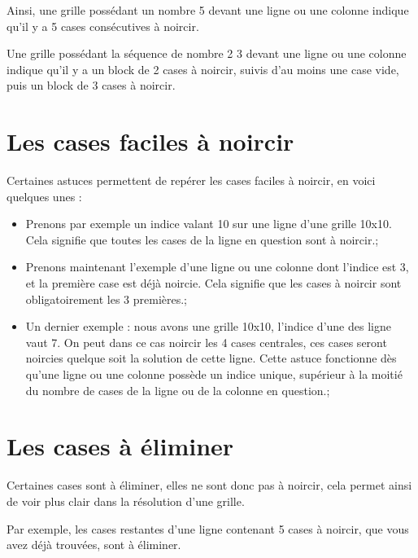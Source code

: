 \documentclass[a4paper, 12pt]{report}
\begin{document}
	        Ainsi, une grille possédant un nombre 5 devant une ligne ou une colonne indique qu'il y a 5 cases consécutives à noircir.

	        Une grille possédant la séquence de nombre 2 3 devant une ligne ou une colonne indique qu'il y a un block de 2 cases à noircir, suivis d'au moins une case vide, puis un block de 3 cases à noircir.


		\section{Les cases faciles à noircir}

            Certaines astuces permettent de repérer les cases faciles à noircir, en voici quelques unes :
            \begin{itemize}
                \item Prenons par exemple un indice valant 10 sur une ligne d'une grille 10x10. Cela signifie que toutes les cases de la ligne en question sont à noircir.;
                \item Prenons maintenant l'exemple d'une ligne ou une colonne dont l'indice est 3, et la première case est déjà noircie. Cela signifie que les cases à noircir sont obligatoirement les 3 premières.;
                \item Un dernier exemple : nous avons une grille 10x10, l'indice d'une des ligne vaut 7. On peut dans ce cas noircir les 4 cases centrales, ces cases seront noircies quelque soit la solution de cette ligne. Cette astuce fonctionne dès qu'une ligne ou une colonne possède un indice unique, supérieur à la moitié du nombre de cases de la ligne ou de la colonne en question.;
            \end{itemize}


		\section{Les cases à éliminer}

            Certaines cases sont à éliminer, elles ne sont donc pas à noircir, cela permet ainsi de voir plus clair dans la résolution d'une grille.

            Par exemple, les cases restantes d'une ligne contenant 5 cases à noircir, que vous avez déjà trouvées, sont à éliminer.

		\section{}
\end{document}
